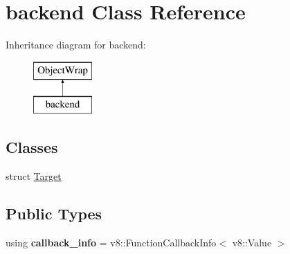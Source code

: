 \hypertarget{classbackend}{}\section{backend Class Reference}
\label{classbackend}
Inheritance diagram for backend\+:\begin{figure}[H]
\begin{center}
\leavevmode
\includegraphics[height=2.000000cm]{classbackend}
\end{center}
\end{figure}
\subsection*{Classes}
\begin{DoxyCompactItemize}
\item 
struct \hyperlink{structbackend_1_1_target}{Target}
\end{DoxyCompactItemize}
\subsection*{Public Types}
\begin{DoxyCompactItemize}
\item 
\mbox{\label{classbackend_aa165cfc3da158f073832ef1f6ce4e1b8}} 
using {\bfseries callback\+\_\+info} = v8\+::\+Function\+Callback\+Info$<$ v8\+::\+Value $>$
\end{DoxyCompactItemize}
